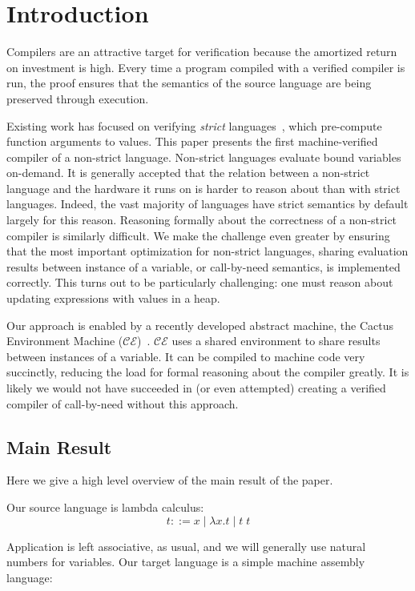 \section{Introduction}
Compilers are an attractive target for verification because the amortized return
on investment is high. Every time a program compiled with a verified compiler is
run, the proof ensures that the semantics of the source language are being
preserved through execution. 

Existing work has focused on verifying \emph{strict}
languages~\cite{chlipala2007certified, leroy2012compcert}, which pre-compute
function arguments to values. This paper presents the first machine-verified
compiler of a non-strict language. Non-strict languages evaluate bound variables
on-demand. It is generally accepted that the relation between a non-strict
language and the hardware it runs on is harder to reason about than with strict languages.
Indeed, the vast majority of languages have strict semantics by default largely
for this reason. Reasoning formally about the correctness of a non-strict
compiler is similarly difficult. We make the challenge even greater by
ensuring that the most important optimization for non-strict languages,
sharing evaluation results between instance of a variable, or call-by-need
semantics, is implemented correctly. This turns out to be particularly
challenging: one must reason about updating expressions with values in a heap. 

Our approach is enabled by a recently developed abstract machine, the Cactus
Environment Machine ($\mathcal{CE}$)~\cite{?}. $\mathcal{CE}$ uses a shared
environment to share results between instances of a variable. It can be compiled
to machine code very succinctly, reducing the load for formal reasoning about
the compiler greatly. It is likely we would not have succeeded in (or even
attempted) creating a verified compiler of call-by-need without this approach.

\subsection{Main Result}
Here we give a high level overview of the main result of the paper.

Our source language is lambda calculus: 
$$ t ::= x \; | \; \lambda x.t \; | \; t \; t $$

Application is left associative, as usual, and we will generally use natural
numbers for variables. Our target language is a simple machine assembly
language:

